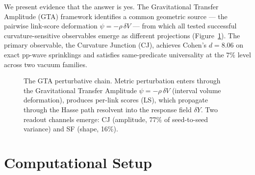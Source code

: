 \documentclass[12pt,a4paper]{article}
\begin{document}
We present evidence that the answer is yes. The Gravitational Transfer Amplitude (GTA) framework identifies a common geometric source --- the pairwise link-score deformation $\psi = -\rho\,\delta V$ --- from which all tested successful curvature-sensitive observables emerge as different projections (Figure~\ref{fig:chain}). The primary observable, the Curvature Junction (CJ), achieves Cohen's $d = 8.06$ on exact pp-wave sprinklings and satisfies same-predicate universality at the $7\%$ level across two vacuum families.

\begin{figure}[h!]
\centering
{}
\caption{The GTA perturbative chain. Metric perturbation enters through the Gravitational Transfer Amplitude $\psi = -\rho\,\delta V$ (interval volume deformation), produces per-link scores (LS), which propagate through the Hasse path resolvent into the response field $\delta Y$. Two readout channels emerge: CJ (amplitude, 77\% of seed-to-seed variance) and SF (shape, 16\%).}
\label{fig:chain}
\end{figure}

\section{Computational Setup}
\end{document}
